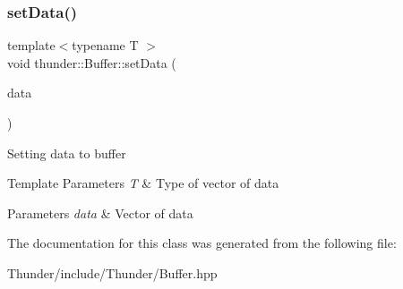 \subsubsection{\texorpdfstring{set\+Data()}{setData()}}
{\footnotesize\ttfamily template$<$typename T $>$ \\
void thunder\+::\+Buffer\+::set\+Data (\begin{DoxyParamCaption}\item[{const std\+::vector$<$ T $>$ \&}]{data }\end{DoxyParamCaption})\hspace{0.3cm}{\ttfamily [inline]}}

Setting data to buffer


\begin{DoxyTemplParams}{Template Parameters}
{\em T} & Type of vector of data \\
\hline
\end{DoxyTemplParams}

\begin{DoxyParams}{Parameters}
{\em data} & Vector of data \\
\hline
\end{DoxyParams}


The documentation for this class was generated from the following file\+:\begin{DoxyCompactItemize}
\item 
Thunder/include/\+Thunder/Buffer.\+hpp\end{DoxyCompactItemize}
